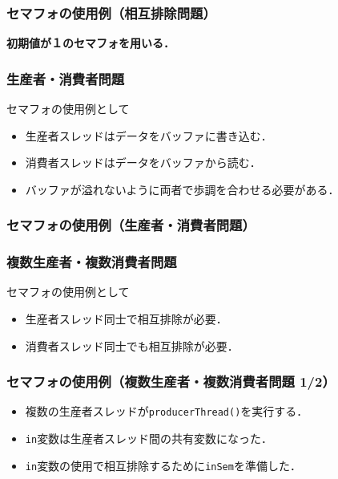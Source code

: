 \documentclass[unicode,handout]{beamer}                   %
\begin{document}
\begin{frame}
  \frametitle{セマフォの使用例（相互排除問題）}
  {\bf 初期値が１のセマフォを用いる．}
\end{frame}

\begin{frame}
  \frametitle{生産者・消費者問題}
  セマフォの使用例として
  \begin{itemize}
  \item 生産者スレッドはデータをバッファに書き込む．
  \item 消費者スレッドはデータをバッファから読む．
  \item バッファが溢れないように両者で歩調を合わせる必要がある．
  \end{itemize}
  \vfill
\end{frame}

\begin{frame}
  \frametitle{セマフォの使用例（生産者・消費者問題）}
\end{frame}

\begin{frame}
  \frametitle{複数生産者・複数消費者問題}
  セマフォの使用例として
  \begin{itemize}
  \item 生産者スレッド同士で相互排除が必要．
  \item 消費者スレッド同士でも相互排除が必要．
  \end{itemize}
  \vfill
\end{frame}

\begin{frame}
  \frametitle{セマフォの使用例（複数生産者・複数消費者問題 1/2）}
  \begin{itemize}
  \item 複数の生産者スレッドが\texttt{producerThread()}を実行する．
  \item \texttt{in}変数は生産者スレッド間の共有変数になった．
  \item \texttt{in}変数の使用で相互排除するために\texttt{inSem}を準備した．
  \end{itemize}
  \vfill
\end{frame}
\end{document}
